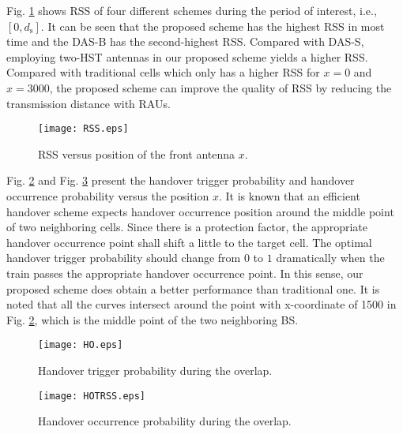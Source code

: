 \documentclass[a4paper,twocolumn,10pt]{IEEEtran}
\newcommand{\picspacec}{{\vspace{-0.1 in}}}
\begin{document}
Fig. \ref{RSS} shows RSS of four different schemes during the period of interest, i.e., $\left[ {0,d_\textrm{s}} \right]$. It can be seen that the proposed scheme has the highest RSS in most time and the DAS-B has the second-highest RSS. Compared with DAS-S, employing two-HST antennas in our proposed scheme yields a higher RSS. Compared with traditional cells which only has a higher RSS for $x=0$ and $x=3000$, the proposed scheme can improve the quality of RSS by reducing the transmission distance with RAUs.

\begin{figure}
\centering
\texttt{[image: RSS.eps]}
\caption{RSS versus position of the front antenna $x$. }
\label{RSS}\picspacec
\end{figure}

Fig. \ref{HO} and Fig. \ref{HOT} present the handover trigger probability and handover occurrence probability versus the position $x$. It is known that an efficient handover scheme expects handover occurrence position around the middle point of two neighboring cells. Since there is a protection factor, the appropriate handover occurrence point shall shift a little to the target cell. The optimal handover trigger probability should change from $0$ to $1$ dramatically when the train passes the appropriate handover occurrence point. In this sense, our proposed scheme does obtain a better performance than traditional one.
It is noted that all the  curves intersect around the point with x-coordinate of 1500 in Fig. \ref{HO}, which is the middle point of the two neighboring BS.


\begin{figure}
\centering
\texttt{[image: HO.eps]}
\caption{Handover trigger probability during the overlap.}
\label{HO}\picspacec
\end{figure}

\begin{figure}
\centering
\texttt{[image: HOTRSS.eps]}
\caption{Handover occurrence probability during the overlap.}
\label{HOT}\picspacec
\end{figure}
\end{document}

